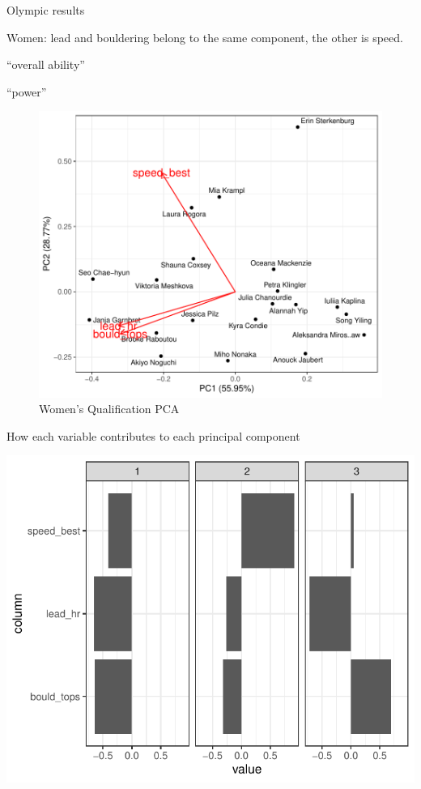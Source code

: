 \documentclass[12pt]{article}
\begin{document}
Olympic results

Women: lead and bouldering belong to the same component, the other is
speed.

``overall ability''

``power''

\begin{figure}

{\centering \includegraphics{draft_files/figure-latex/unnamed-chunk-20-1} 

}

\caption{Women's Qualification PCA}\label{fig:unnamed-chunk-20}
\end{figure}

How each variable contributes to each principal component

\begin{center}\includegraphics{draft_files/figure-latex/unnamed-chunk-21-1} \end{center}
\end{document}
